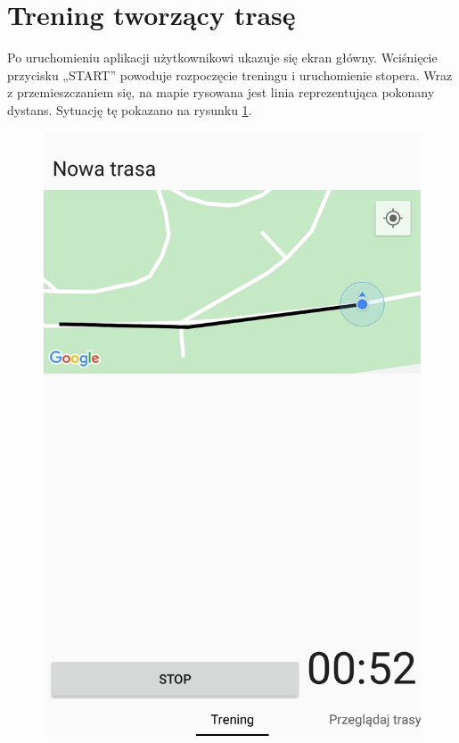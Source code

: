 \section{Trening tworzący trasę}
Po uruchomieniu aplikacji użytkownikowi ukazuje się ekran główny. Wciśnięcie przycisku „START” powoduje rozpoczęcie treningu i uruchomienie stopera. Wraz z przemieszczaniem się, na mapie rysowana jest linia reprezentująca pokonany dystans. Sytuację tę pokazano na rysunku \ref{image:tworzenie-screen}.
\begin{figure}
\centering
\begin{minipage}{.5\textwidth}
  \centering
  \captionsetup{justification=centering}
  \includegraphics[width=.8\linewidth,frame]{img/tworzenie}
  \label{image:tworzenie-screen}
\end{minipage}%
\begin{minipage}{.5\textwidth}
  \centering
  \captionsetup{justification=centering}

\end{minipage}
\end{figure}
